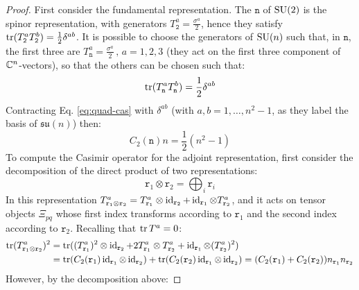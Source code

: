 \begin{proofbox}
  \begin{proof}
    First consider the fundamental representation. The $ \mathtt{n} $ of $ \mathrm{SU}(2) $ is the spinor representation, with generators $ T^a_\mathtt{2} = \frac{\sigma^a}{2} $, hence they satisfy $ \operatorname{tr}(T^a_\mathtt{2} T^b_\mathtt{2}) = \frac{1}{2} \delta^{ab} $. It is possible to choose the generators of $ \mathrm{SU}(n) $ such that, in $ \mathtt{n} $, the first three are $ T^a_\mathtt{n} = \frac{\sigma^a}{2} \,,\, a = 1,2,3 $ (they act on the first three component of $ \mathbb{C}^n $-vectors), so that the others can be chosen such that:
    \begin{equation*}
      \operatorname{tr} (T^a_\mathtt{n} T^b_\mathtt{n}) = \frac{1}{2} \delta^{ab}
    \end{equation*}
    Contracting Eq. \ref{eq:quad-cas} with $ \delta^{ab} $ (with $ a,b = 1,\dots, n^2 - 1 $, as they label the basis of $ \mathfrak{su}(n) $) then:
    \begin{equation*}
      C_2(\mathtt{n}) n = \frac{1}{2} (n^2 - 1)
    \end{equation*}
    To compute the Casimir operator for the adjoint representation, first consider the decomposition of the direct product of two representations:
    \begin{equation*}
      \mathtt{r}_1 \otimes \mathtt{r}_2 = \bigoplus_i \mathtt{r}_i
    \end{equation*}
    In this representation $ T^a_{\mathtt{r}_1 \otimes \mathtt{r}_2} = T^a_{\mathtt{r}_1} \otimes \operatorname{id}_{\mathtt{r}_2} + \operatorname{id}_{\mathtt{r}_1} \otimes T^a_{\mathtt{r}_2} $, and it acts on tensor objects $ \Xi_{pq} $ whose first index transforms according to $ \mathtt{r}_1 $ and the second index according to $ \mathtt{r}_2 $. Recalling that $ \operatorname{tr}{T^a} = 0 $:
    \begin{equation*}
      \begin{split}
        \operatorname{tr} (T^a_{\mathtt{r}_1 \otimes \mathtt{r}_2})^2
        &= \operatorname{tr} ((T^a_{\mathtt{r}_1})^2 \otimes \operatorname{id}_{\mathtt{r}_2} + 2 T^a_{\mathtt{r}_1} \otimes T^a_{\mathtt{r}_2} + \operatorname{id}_{\mathtt{r}_1} \otimes (T^a_{\mathtt{r}_2})^2) \\
        &= \operatorname{tr} (C_2(\mathtt{r}_1) \operatorname{id}_{\mathtt{r}_1} \otimes \operatorname{id}_{\mathtt{r}_2}) + \operatorname{tr} (C_2(\mathtt{r}_2) \operatorname{id}_{\mathtt{r}_1} \otimes \operatorname{id}_{\mathtt{r}_2}) = (C_2(\mathtt{r}_1) + C_2(\mathtt{r}_2)) n_{\mathtt{r}_1} n_{\mathtt{r}_2}
      \end{split}
    \end{equation*}
    However, by the decomposition above:

\end{proof}
\end{proofbox}
